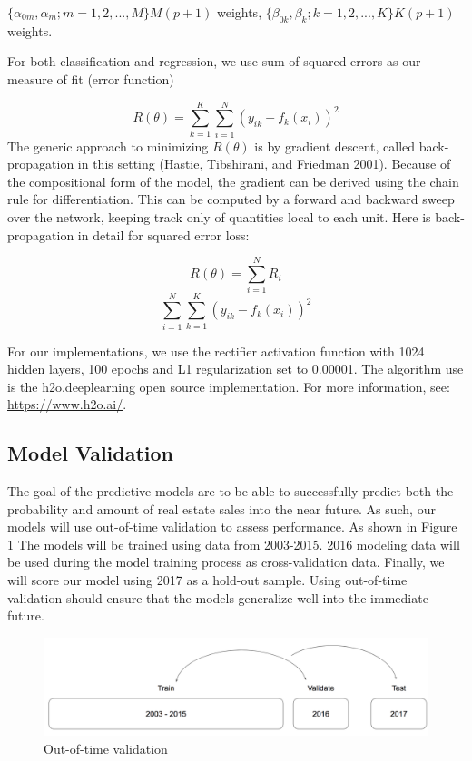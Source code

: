 \documentclass[12pt,]{article}
\begin{document}
\(\{\alpha_{0m},\alpha_m;m=1,2,...,M\} M(p+1)\) weights,
\(\{\beta_{0k},\beta_k;k=1,2,...,K\} K(p+1)\) weights.

For both classification and regression, we use sum-of-squared errors as
our measure of fit (error function)

\[
R(\theta)=\sum_{k=1}^K\sum_{i=1}^N(y_{ik}-f_{k}(x_i))^2
\] The generic approach to minimizing \(R(\theta)\) is by gradient
descent, called back-propagation in this setting (Hastie, Tibshirani,
and Friedman 2001). Because of the compositional form of the model, the
gradient can be derived using the chain rule for differentiation. This
can be computed by a forward and backward sweep over the network,
keeping track only of quantities local to each unit. Here is
back-propagation in detail for squared error loss:

\[
R(\theta) = \sum_{i=1}^NR_i
\] \[
\sum_{i=1}^N\sum_{k=1}^K(y_{ik}-f_{k}(x_i))^2
\]

For our implementations, we use the rectifier activation function with
1024 hidden layers, 100 epochs and L1 regularization set to 0.00001. The
algorithm use is the h2o.deeplearning open source implementation. For
more information, see: \url{https://www.h2o.ai/}.

\hypertarget{model-validation}{%
\subsection{Model Validation}\label{model-validation}}

The goal of the predictive models are to be able to successfully predict
both the probability and amount of real estate sales into the near
future. As such, our models will use out-of-time validation to assess
performance. As shown in Figure \ref{fig:Train Test Validate} The models
will be trained using data from 2003-2015. 2016 modeling data will be
used during the model training process as cross-validation data.
Finally, we will score our model using 2017 as a hold-out sample. Using
out-of-time validation should ensure that the models generalize well
into the immediate future.

\begin{figure}[H]
\includegraphics[width=1\linewidth]{Sections/tables and figures/Train Validate Test} \caption{Out-of-time validation}\label{fig:Train Test Validate}
\end{figure}
\end{document}
